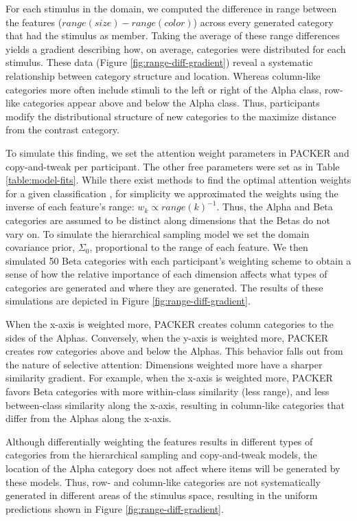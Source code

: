 \documentclass[10pt,letterpaper]{article}
\begin{document}
For each stimulus in the domain, we computed the difference in range between the features ($range(size) - range(color)$) across every generated category that had the stimulus as member. Taking the average of these range differences yields a gradient describing how, on average, categories were distributed for each stimulus. These data (Figure \ref{fig:range-diff-gradient}) reveal a systematic relationship between category structure and location. Whereas column-like categories more often include stimuli to the left or right of the Alpha class, row-like categories appear above and below the Alpha class.  Thus, participants modify the distributional structure of new categories to the maximize distance from the contrast category.

To simulate this finding, we set the attention weight parameters in PACKER and copy-and-tweak per participant. The other free parameters were set as in Table \ref{table:model-fits}. While there exist methods to find the optimal attention weights for a given classification \citep[see][]{vanpaemel2012using}, for simplicity we approximated the weights using the inverse of each feature's range: $w_k \propto range(k)^{-1}$. Thus, the Alpha and Beta categories are assumed to be distinct along dimensions that the Betas do not vary on. To simulate the hierarchical sampling model we set the domain covariance prior, $\Sigma_0$, proportional to the range of each feature. We then simulated 50 Beta categories with each participant's weighting scheme to obtain a sense of how the relative importance of each dimension affects what types of categories are generated and where they are generated. The results of these simulations are depicted in Figure \ref{fig:range-diff-gradient}.

When the x-axis is weighted more, PACKER creates column categories to the sides of the Alphas. Conversely, when the y-axis is weighted more, PACKER creates row categories above and below the Alphas. This behavior falls out from the nature of selective attention: Dimensions weighted more have a sharper similarity gradient. For example, when the x-axis is weighted more, PACKER favors Beta categories with more within-class similarity (less range), and less between-class similarity along the x-axis, resulting in column-like categories that differ from the Alphas along the x-axis.

Although differentially weighting the features results in different types of categories from the hierarchical sampling and copy-and-tweak models, the location of the Alpha category does not affect where items will be generated by these models. Thus, row- and column-like categories are not systematically generated in different areas of the stimulus space, resulting in the uniform predictions shown in Figure \ref{fig:range-diff-gradient}.
\end{document}
